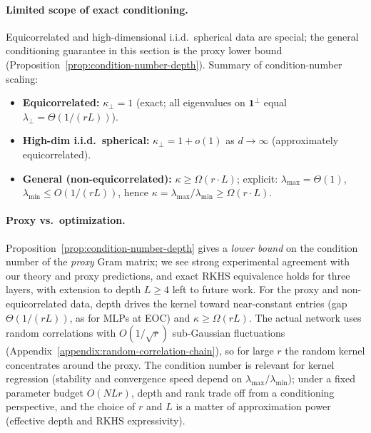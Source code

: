 \paragraph{Limited scope of exact conditioning.}
Equicorrelated and high-dimensional i.i.d.\ spherical data are special; the general conditioning guarantee in this section is the proxy lower bound (Proposition~\ref{prop:condition-number-depth}). Summary of condition-number scaling:
\begin{itemize}
  \item \textbf{Equicorrelated:} \(\kappa_\perp=1\) (exact; all eigenvalues on \(\mathbf{1}^\perp\) equal \(\lambda_\perp=\Theta(1/(rL))\)).
  \item \textbf{High-dim i.i.d.\ spherical:} \(\kappa_\perp=1+o(1)\) as \(d\to\infty\) (approximately equicorrelated).
  \item \textbf{General (non-equicorrelated):} \(\kappa\ge\Omega(r\cdot L)\); explicit: \(\lambda_{\max}=\Theta(1)\), \(\lambda_{\min}\le O(1/(rL))\), hence \(\kappa=\lambda_{\max}/\lambda_{\min}\ge\Omega(r\cdot L)\).
\end{itemize}

\paragraph{Proxy vs.\ optimization.}\label{rmk:depth-conditioning-message}
Proposition~\ref{prop:condition-number-depth} gives a \emph{lower bound} on the condition number of the \emph{proxy} Gram matrix; we see strong experimental agreement with our theory and proxy predictions, and exact RKHS equivalence holds for three layers, with extension to depth \(L\ge 4\) left to future work. For the proxy and non-equicorrelated data, depth drives the kernel toward near-constant entries (gap \(\Theta(1/(rL))\), as for MLPs at EOC) and \(\kappa\ge\Omega(rL)\). The actual network uses random correlations with \(O(1/\sqrt{r})\) sub-Gaussian fluctuations (Appendix~\ref{appendix:random-correlation-chain}), so for large \(r\) the random kernel concentrates around the proxy. The condition number is relevant for kernel regression (stability and convergence speed depend on \(\lambda_{\max}/\lambda_{\min}\)); under a fixed parameter budget \(O(NLr)\), depth and rank trade off from a conditioning perspective, and the choice of \(r\) and \(L\) is a matter of approximation power (effective depth and RKHS expressivity).
